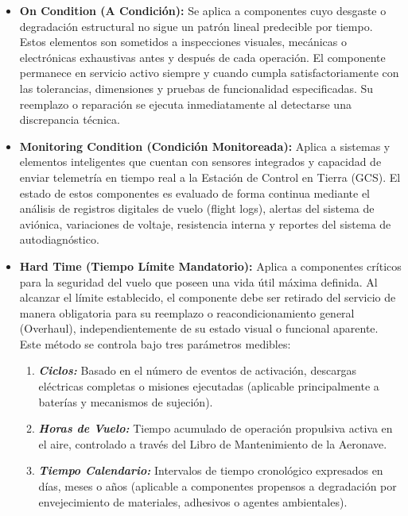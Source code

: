 \begin{itemize}
    \item \textbf{On Condition (A Condición):} Se aplica a componentes cuyo desgaste o degradación estructural no sigue un patrón lineal predecible por tiempo. Estos elementos son sometidos a inspecciones visuales, mecánicas o electrónicas exhaustivas antes y después de cada operación. El componente permanece en servicio activo siempre y cuando cumpla satisfactoriamente con las tolerancias, dimensiones y pruebas de funcionalidad especificadas. Su reemplazo o reparación se ejecuta inmediatamente al detectarse una discrepancia técnica.
    \item \textbf{Monitoring Condition (Condición Monitoreada):} Aplica a sistemas y elementos inteligentes que cuentan con sensores integrados y capacidad de enviar telemetría en tiempo real a la Estación de Control en Tierra (GCS). El estado de estos componentes es evaluado de forma continua mediante el análisis de registros digitales de vuelo (flight logs), alertas del sistema de aviónica, variaciones de voltaje, resistencia interna y reportes del sistema de autodiagnóstico.
    \item \textbf{Hard Time (Tiempo Límite Mandatorio):} Aplica a componentes críticos para la seguridad del vuelo que poseen una vida útil máxima definida. Al alcanzar el límite establecido, el componente debe ser retirado del servicio de manera obligatoria para su reemplazo o reacondicionamiento general (Overhaul), independientemente de su estado visual o funcional aparente. Este método se controla bajo tres parámetros medibles:
    
    \begin{enumerate}
        \item \textit{\textbf{Ciclos:}} Basado en el número de eventos de activación, descargas eléctricas completas o misiones ejecutadas (aplicable principalmente a baterías y mecanismos de sujeción).
        \item \textit{\textbf{Horas de Vuelo:}} Tiempo acumulado de operación propulsiva activa en el aire, controlado a través del Libro de Mantenimiento de la Aeronave.
        \item \textit{\textbf{Tiempo Calendario:}} Intervalos de tiempo cronológico expresados en días, meses o años (aplicable a componentes propensos a degradación por envejecimiento de materiales, adhesivos o agentes ambientales).
    \end{enumerate}
\end{itemize}

